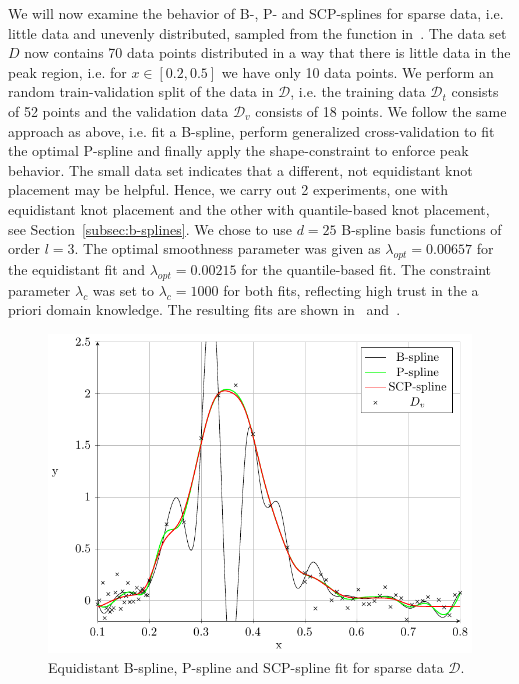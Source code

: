 We will now examine the behavior of B-, P- and SCP-splines for sparse data, i.e. little data and unevenly distributed, sampled from the function in~. The data set $D$ now contains 70 data points distributed in a way that there is little data in the peak region, i.e. for $x \in [0.2, 0.5]$ we have only 10 data points. We perform an random train-validation split of the data in $\mathcal{D}$, i.e. the training data $\mathcal{D}_t$ consists of 52 points and the validation data $\mathcal{D}_v$ consists of 18 points. We follow the same approach as above, i.e. fit a B-spline, perform generalized cross-validation to fit the optimal P-spline and finally apply the shape-constraint to enforce peak behavior. The small data set indicates that a different, not equidistant knot placement may be helpful. Hence, we carry out 2 experiments, one with equidistant knot placement and the other with quantile-based knot placement, see Section~\ref{subsec:b-splines}. We chose to use $d=25$ B-spline basis functions of order $l=3$. The optimal smoothness parameter was given as $\lambda_{opt} = 0.00657$ for the equidistant fit and $\lambda_{opt} = 0.00215$ for the quantile-based fit. The constraint parameter $\lambda_c$ was set to $\lambda_c=1000$ for both fits, reflecting high trust in the a priori domain knowledge. The resulting fits are shown in~ and~.


\begin{figure}[H]
	\centering
	\includegraphics{graphics/pgfplots/cha4/exp-sparse-equidistant.pdf}
	\caption{Equidistant B-spline, P-spline and SCP-spline fit for sparse data $\mathcal{D}$.}
	\label{fig:sparse-example-equidistant}
\end{figure}

